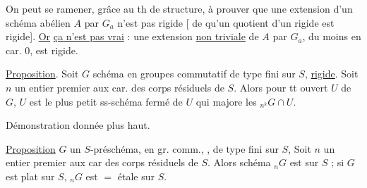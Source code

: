 On  peut se ramener, grâce au th de structure, à prouver que une extension d'un schéma abélien $A$ par $G_a$ n'est pas rigide [ de  qu'un quotient d'un rigide est rigide]. \uline{Or} \uline{ça n'est pas vrai} : une extension \uline{non triviale} de $A$ par $G_a$, du moins en car. 0, est rigide.

\uline{Proposition}. Soit $G$ schéma en groupes commutatif  de type fini sur $S$, \uline{rigide}. Soit $n$ un entier premier aux car. des corps résiduels de $S$. Alors  pour tt ouvert $U$ de $G$, $U$ est le plus petit ss-schéma fermé de $U$ qui majore les $ {}_{n^k}G\cap U$.

Démonstration donnée plus haut.

\uline{Proposition} $G$ un $S$-préschéma, en gr.  comm., , de type fini sur $S$,  Soit $n$ un entier  premier aux car des corps résiduels de $S$. Alors   schéma $ {}_nG$ est  sur $S$ ;  si $G$ est plat sur $S$, $ {}_nG$ est $=$ étale sur $S$.
